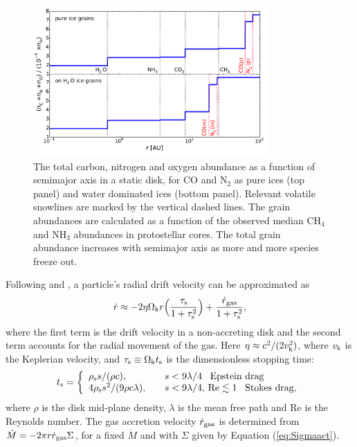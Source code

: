 \documentclass[apj]{emulateapj}
\begin{document}
\begin{figure}[t!]
\centering
\includegraphics[width=0.8\textwidth]{CNO_and_snowlines_2.pdf}
\caption{The total carbon, nitrogen and oxygen abundance as a function of semimajor axis in a static disk, for CO and N$_2$ as pure ices (top panel) and water dominated ices (bottom panel). Relevant volatile snowlines are marked by the vertical dashed lines. The grain abundances are calculated as a function of the observed median CH$_4$ and NH$_3$ abundances in protostellar cores. The total grain abundance increases with semimajor axis as more and more species freeze out.} 
\label{fig:CNOstatic}
\end{figure}

Following \citet{chiang10} and \citet{birnstiel12}, a particle's radial drift velocity can be approximated as 
\begin{equation}
\label{eq:rdotact}
\dot{r} \approx -2 \eta \Omega_{\rm k} r \Big(\frac{\tau_{\rm s}}{1+\tau_{\rm s}^2}\Big) + \frac{\dot{r}_{\rm gas}}{1+\tau_{\rm s}^2},
\end{equation}
where the first term is the drift velocity in a non-accreting disk and the second term accounts for the radial movement of the gas. Here $\eta \approx c^2/(2 v_{\rm k}^2)$, where $v_{\rm k}$ is the Keplerian velocity, and $\tau_{\rm s} \equiv \Omega_{\rm k} t_{\rm s}$ is the dimensionless stopping time:
\begin{equation}
\label{eq:ts}
t_{\rm s}= \left\{
\begin{array}{l l}
\rho_{\rm s} s / (\rho c), & \quad s < 9 \lambda/4 \,\,\,\ \text{Epstein drag} \\
4 \rho_{\rm s} s^2 / (9 \rho c \lambda), & \quad s < 9 \lambda/4, \,\text{Re} \lesssim 1 \,\,\,\ \text{Stokes drag,}
\end{array} 
\right.
\end{equation}
where $\rho$ is the disk mid-plane density, $\lambda$ is the mean free path and Re is the Reynolds number.  The gas accretion velocity $\dot{r}_{\rm gas}$ is determined from $\dot{M}=-2 \pi r \dot{r}_{\rm gas} \Sigma$, for a fixed $\dot{M}$ and with $\Sigma$ given by Equation (\ref{eq:Sigmaact}). 
\end{document}
